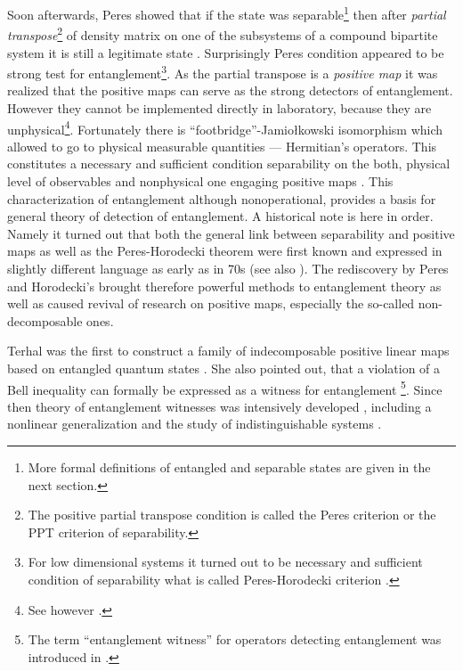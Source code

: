 \documentclass[twocolumn,aps,rmp]{revtex4}
\begin{document}
Soon afterwards, Peres showed that if the state was
separable\footnote{More formal definitions of entangled and separable
  states are given in the next section.} then after {\it partial
  transpose}\footnote{The positive partial transpose condition is
  called the Peres criterion or the PPT criterion of separability.} of
density matrix on one of the subsystems of a compound bipartite system
it is still a legitimate state \cite {Peres}. Surprisingly Peres
condition appeared to be strong test for entanglement\footnote{For low
  dimensional systems it turned out to be necessary and sufficient
  condition of separability what is called Peres-Horodecki criterion
  \cite{sep1996}.}. As the partial transpose is a {\it positive map}
it was realized that the positive maps can serve as the strong
detectors of entanglement. However they cannot be implemented directly
in laboratory, because they are unphysical\footnote {See however \cite
  {PHAE}.}. Fortunately there is ``footbridge''-Jamio\l{}kowski
isomorphism \cite {Jamiolkowski} which allowed to go to physical
measurable quantities --- Hermitian's operators. This constitutes a
necessary and sufficient condition separability on the both, physical
level of observables and nonphysical one engaging positive maps \cite
{sep1996}. This characterization of entanglement although
nonoperational, provides a basis for general theory of detection of
entanglement.  A historical note is here in order.  Namely it turned
out that both the general link between separability and positive maps
as well as the Peres-Horodecki theorem were first known and expressed
in slightly different language as early as in 70s \cite{Choi1972}
(see also \cite{Osaka,Woronowicz,Stoermer}).  The rediscovery by Peres
and Horodecki's brought therefore powerful methods to entanglement
theory as well as caused revival of research on positive maps,
especially the so-called non-decomposable ones.

Terhal was the first
to construct a family of indecomposable positive linear maps based on
entangled quantum states \cite {Terhal2000-laa}. She also pointed out,
that a violation of a Bell inequality can formally be expressed as a
witness for entanglement \cite {TerhalB}\footnote {The term
  ``entanglement witness'' for operators detecting entanglement was
  introduced in \cite {TerhalB}.}.  Since then theory of entanglement
witnesses was intensively developed \cite {Lewenstein00a,TothG_s,
  GuehneHBE_s,Kiesel_s,BrussReflections,BrandaoV,Brandao2005-witent},
including a nonlinear generalization \cite {GuehneL1,GuehneLutkenhaus}
and the study of indistinguishable systems \cite
{SchliemannCKML-fermion,EckertSBL-fermion}.
\end{document}
